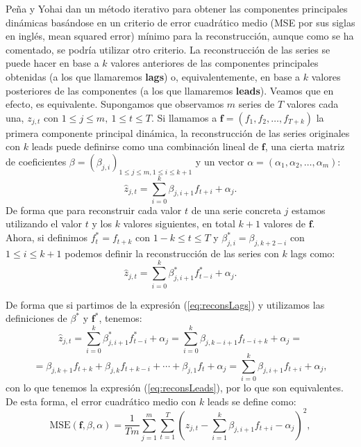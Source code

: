Peña y Yohai dan un método iterativo para obtener las componentes principales dinámicas basándose en un criterio de error cuadrático medio (MSE por sus siglas en inglés, mean squared error) mínimo para la reconstrucción, aunque como se ha comentado, se podría utilizar otro criterio. La reconstrucción de las series se puede hacer en base a $k$ valores anteriores de las componentes principales obtenidas (a los que llamaremos \textbf{lags}) o, equivalentemente, en base a $k$ valores posteriores de las componentes (a los que llamaremos \textbf{leads}). Veamos que en efecto, es equivalente. Supongamos que observamos $m$ series de $T$ valores cada una, $z_{j,t}$ con $1 \leq j \leq m,\ 1 \leq t \leq T$. Si llamamos a $\mathbf{f} = (f_1, f_2, \dots, f_{T+k})$ la primera componente principal dinámica, la reconstrucción de las series originales con $k$ leads puede definirse como una combinación lineal de $\mathbf{f}$, una cierta matriz de coeficientes $\beta = (\beta_{j,i})_{1 \leq j \leq m, 1 \leq i \leq k+1}$ y un vector $\alpha = (\alpha_1, \alpha_2, \dots, \alpha_m)$:
\begin{equation}\label{eq:reconsLeads}
	\widehat{z}_{j,t} = \sum_{i=0}^k \beta_{j,i+1}f_{t+i} + \alpha_j.
\end{equation}
De forma que para reconstruir cada valor $t$ de una serie concreta $j$ estamos utilizando el valor $t$ y los $k$ valores siguientes, en total $k+1$ valores de $\mathbf{f}$.\\

Ahora, si definimos $f_t^* = f_{t+k}$ con $1-k \leq t \leq T$ y $\beta_{j,i}^* = \beta_{j, k+2-i}$ con $1 \leq i \leq k+1$ podemos definir la reconstrucción de las series con $k$ lags como:
\begin{equation}\label{eq:reconsLags}
	\widehat{z}_{j,t} = \sum_{i=0}^k \beta_{j,i+1}^*f_{t-i}^* + \alpha_j.
\end{equation}

De forma que si partimos de la expresión (\ref{eq:reconsLags}) y utilizamos las definiciones de $\beta^*$ y $\mathbf{f}^*$, tenemos:
\[	\widehat{z}_{j,t} = \sum_{i=0}^k \beta_{j,i+1}^*f_{t-i}^* + \alpha_j = \sum_{i=0}^k \beta_{j,k-i+1}f_{t-i+k} + \alpha_j	 = \]
\[ = \beta_{j,k+1}f_{t+k} + \beta_{j,k}f_{t+k-i} + \cdots + \beta_{j,1}f_t + \alpha_j = \sum_{i=0}^k \beta_{j,i+1}f_{t+i} + \alpha_j,	\]
con lo que tenemos la expresión (\ref{eq:reconsLeads}), por lo que son equivalentes.\\

De esta forma, el error cuadrático medio con $k$ leads se define como:
\begin{equation}\label{MSE}
\text{MSE}(\mathbf{f}, \beta, \alpha) = \frac{1}{Tm} \sum_{j=1}^m \sum_{t=1}^T (z_{j,t} - \sum_{i=1}^k \beta_{j,i+1}f_{t+i} - \alpha_j)^2,
\end{equation}

